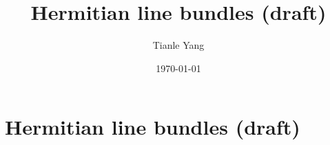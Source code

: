 \documentclass{noteformyself}
\title{Hermitian line bundles (draft)}
\author{Tianle Yang}
\date{\today}
\begin{document}
    \maketitle

    \section{Hermitian line bundles (draft)}



\end{document}

